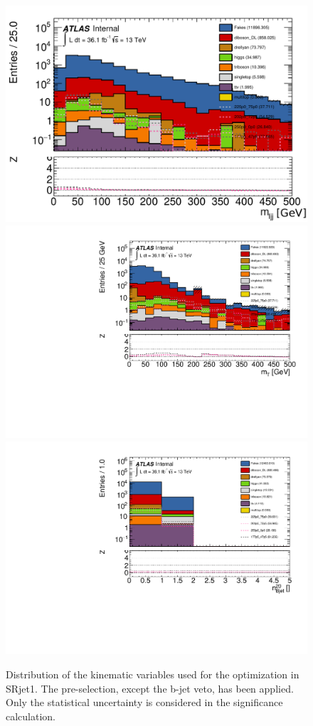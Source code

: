 \begin{figure}[htpb]
\includegraphics[width=0.45\linewidth]{data/plot/SR_redefinition/SRjet1_step0/lemljj_comb_fakes.pdf}\includegraphics[width=0.45\linewidth]{data/plot/SR_redefinition/SRjet1_step0/lemt_fakes.pdf}\\
\includegraphics[width=0.45\linewidth]{data/plot/SR_redefinition/SRjet1_step0/nBJet20_MV2c10_fakes.pdf}
\caption{Distribution of the kinematic variables used for the optimization in SRjet1. The pre-selection, except the b-jet veto, has been applied. Only the statistical uncertainty is considered in the significance calculation.}
\label{fig:SRjet1_pre-selection}
\end{figure}

